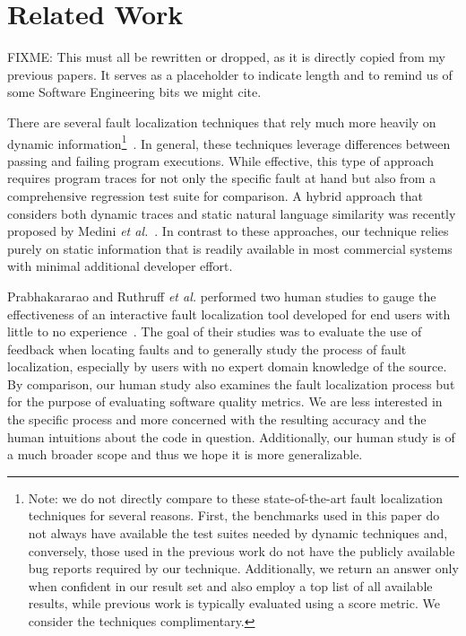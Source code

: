 \documentclass[conference]{IEEEtran}
\begin{document}
\section{Related Work}
FIXME: This must all be rewritten or dropped, as it is directly copied from
my previous papers. It serves as a placeholder to indicate length and to
remind us of some Software Engineering bits we might cite.

There are several fault localization techniques that rely much more heavily
on dynamic information\footnote{Note: we do not directly compare to these
state-of-the-art fault localization techniques for several reasons.  First,
the benchmarks used in this paper do not always have available the test
suites needed by dynamic techniques and, conversely, those used in the
previous work do not have the publicly available bug reports required
by our technique.  Additionally, we return an answer only when confident in
our result set and also employ a top list of all available results, while
previous work is typically evaluated using a score metric.  We consider the
techniques complimentary.}~\cite
{harrold05,Renieris03,cleve05,wang09}.
In general,
these techniques leverage differences between passing and failing program
executions.  While effective, this type of approach requires program traces
for not only the specific fault at hand but also from a comprehensive regression
test suite for comparison.
A hybrid approach that considers both dynamic
traces and static natural language similarity was recently proposed by
Medini \textit{et al.}~\cite{Medini11}.
In contrast to these approaches, our technique relies purely on static
information that is readily available in most commercial systems with minimal
additional developer effort.

Prabhakararao and Ruthruff \emph{et al.} performed two human studies
to gauge the effectiveness of an interactive fault localization tool
developed for end users with little to no
experience~\cite{Prabhakararao03,ruthruff05}.  The goal of their
studies was to evaluate the use of feedback when locating faults and
to generally study the process of fault localization, especially by
users with no expert domain knowledge of the source.  By comparison,
our human study also examines the fault localization process but for
the purpose of evaluating software quality metrics.  We are less
interested in the specific process and more concerned with the
resulting accuracy and the human intuitions about the code in
question.  Additionally, our human study is of a much broader scope and
thus we hope it is more generalizable.
\end{document}
